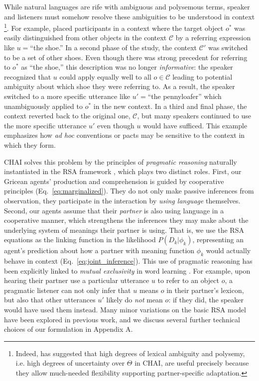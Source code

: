 While natural languages are rife with ambiguous and polysemous terms, speaker and listeners must somehow resolve these ambiguities to be understood in context \cite{PiantadosiTilyGibson12_Ambiguity}\footnote{Indeed,  has suggested that high degrees of lexical ambiguity and polysemy, i.e. high degrees of uncertainty over $\Theta$ in CHAI, are useful precisely because they allow much-needed flexibility supporting partner-specific adaptation.}. 
For example,  placed participants in a context where the target object $o^*$ was easily distinguished from other objects in the context $\mathcal{C}$ by a referring expression like $u=$``the shoe.''
In a second phase of the study, the context $\mathcal{C}'$ was switched to be a set of other shoes.
Even though there was strong precedent for referring to $o^*$ as ``the shoe,'' this description was no longer \emph{informative}: the speaker recognized that $u$ could apply equally well to all $o\in\mathcal{C}$ leading to potential ambiguity about which shoe they were referring to.
As a result, the speaker switched to a more specific utterance like $u'=$``the pennyloafer'' which unambiguously applied to $o^*$ in the new context.
In a third and final phase, the context reverted back to the original one, $\mathcal{C}$, but many speakers continued to use the more specific utterance $u'$ even though $u$ would have sufficed.
This example emphasizes how \emph{ad hoc} conventions or pacts may be sensitive to the context in which they form.

CHAI solves this problem by the principles of \textit{pragmatic reasoning} naturally instantiated in the RSA framework \cite{FrankGoodman12_PragmaticReasoningLanguageGames}, which plays two distinct roles.
First, our Gricean agents'  production and comprehension is guided by cooperative principles (Eq.~\ref{eq:marginalized}).
They do not only make passive inferences from observation, they participate in the interaction by \emph{using language} themselves.
Second, our agents assume that their \emph{partner} is also using language in a cooperative manner, which strengthens the inferences they may make about the underlying system of meanings their partner is using.
That is, we use the RSA equations as the linking function in the likelihood $P(D_k | \phi_k)$, representing an agent's prediction about how a partner with meaning function $\phi_k$ would actually behave in context (Eq.~\ref{eq:joint_inference}). 
This use of pragmatic reasoning has been explicitly linked to \emph{mutual exclusivity} in word learning \cite{bloom2002children,FrankGoodmanTenenbaum09_Wurwur,SmithGoodmanFrank13_RecursivePragmaticReasoningNIPS,gulordava2020one,ohmerreinforcement}.
For example, upon hearing their partner use a particular utterance $u$ to refer to an object $o$, a pragmatic listener can not only infer that $u$ means $o$ in their partner's lexicon, but also that other utterances $u'$ likely do \emph{not} mean $o$: if they did, the speaker would have used them instead.
Many minor variations on the basic RSA model have been explored in previous work, and we discuss several further technical choices of our formulation in Appendix A.

